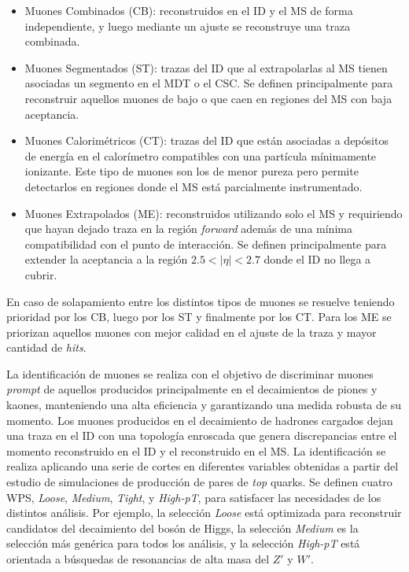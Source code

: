 \begin{itemize}

	\item Muones Combinados (CB): reconstruidos en el ID y el MS de forma independiente, y luego mediante un ajuste se reconstruye una traza combinada. 

	\item Muones Segmentados (ST): trazas del ID que al extrapolarlas al MS tienen asociadas un segmento en el MDT o el CSC. Se definen principalmente para reconstruir aquellos muones de bajo \pt o que caen en regiones del MS con baja aceptancia.

	\item Muones Calorimétricos (CT): trazas del ID que están asociadas a depósitos de energía en el calorímetro compatibles con una partícula mínimamente ionizante. Este tipo de muones son los de menor pureza pero permite detectarlos en regiones donde el MS está parcialmente instrumentado.

	\item Muones Extrapolados (ME): reconstruidos utilizando solo el MS y requiriendo que hayan dejado traza en la región \textit{forward} además de una mínima compatibilidad con el punto de interacción. Se definen principalmente para extender la aceptancia a la región $2.5<|\eta|<2.7$ donde el ID no llega a cubrir.

\end{itemize}

En caso de solapamiento entre los distintos tipos de muones se resuelve teniendo prioridad por los CB, luego por los ST y finalmente por los CT. Para los ME se priorizan aquellos muones con mejor calidad en el ajuste de la traza y mayor cantidad de \textit{hits}.

La identificación de muones se realiza con el objetivo de discriminar muones \textit{prompt} de aquellos producidos principalmente en el decaimientos de piones y kaones, manteniendo una alta eficiencia y garantizando una medida robusta de su momento. Los muones producidos en el decaimiento de hadrones cargados dejan una traza en el ID con una topología enroscada  que genera discrepancias entre el momento reconstruido en el ID y el reconstruido en el MS. La identificación se realiza aplicando una serie de cortes en diferentes variables \cite{PERF-2015-10} obtenidas a partir del estudio de simulaciones de producción de pares de \textit{top} quarks. Se definen cuatro WPS, \textit{Loose}, \textit{Medium}, \textit{Tight}, y \textit{High-pT}, para satisfacer las necesidades de los distintos análisis. Por ejemplo, la selección \textit{Loose} está optimizada para reconstruir candidatos del decaimiento del bosón de Higgs, la selección \textit{Medium} es la selección más genérica para todos los análisis, y la selección \textit{High-pT} está orientada a búsquedas de resonancias de alta masa del $Z'$ y $W'$.

